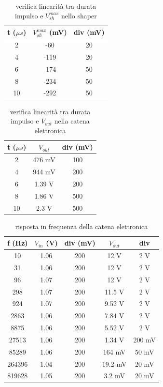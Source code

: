 \documentclass{article}
\begin{document}
\begin{table}[H]
    \centering
    \begin{tabular}{ccc}
        \toprule
        t ($\mu s$) & $V_{sh}^{max}$ (mV) & div (mV) \\
        \midrule
        2 & -60 & 20 \\
        4 & -119 & 20 \\
        6 & -174 & 50 \\
        8 & -234 & 50 \\
        10 & -292 & 50 \\
        \bottomrule
    \end{tabular}
    \caption{verifica linearità tra durata impulso e $V_{sh}^{max}$ nello shaper}
\end{table}


\begin{table}[H]
    \centering
    \begin{tabular}{ccc}
        \toprule
        t ($\mu s$) & $V_{out}$ & div (mV) \\
        \midrule
        2 & 476 mV& 100 \\
        4 & 944 mV& 200 \\
        6 & 1.39 V & 200 \\
        8 & 1.86 V & 500 \\
        10 & 2.3 V & 500 \\
        \bottomrule
    \end{tabular}
    \caption{verifica linearità tra durata impulso e $V_{out}$ nella catena elettronica}
\end{table}


\begin{table}[H]
    \centering
    \begin{tabular}{ccccc}
        \toprule
        f (Hz) & $V_{in}$ (V) & div (mV) & $V_{out}$ & div\\
        \midrule
        10 & 1.06 & 200 & 12 V & 2 V\\
        31 & 1.06 & 200 & 12 V& 2 V\\
        96 & 1.07 & 200 & 12 V& 2 V\\
        298 & 1.07 & 200 & 11.5 V& 2 V\\
        924 & 1.07 & 200 & 9.52 V& 2 V\\
        2863 & 1.06 & 200 & 7.84 V& 2 V\\
        8875 & 1.06 & 200 & 5.52 V& 2 V\\
        27513 & 1.06 & 200 & 1.34 V& 200 mV\\
        85289 & 1.06 & 200 & 164 mV& 50 mV\\
        264396 & 1.04 & 200 & 19.2 mV & 20 mV\\
        819628 & 1.05 & 200 & 3.2 mV & 20 mV\\
        \bottomrule
    \end{tabular}
    \caption{risposta in frequenza della catena elettronica}
\end{table}
\end{document}
